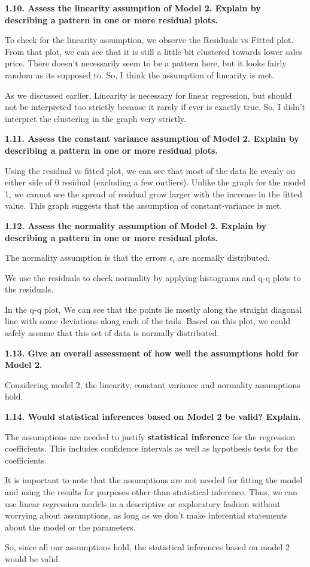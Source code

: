 \documentclass[
]{article}
\begin{document}
\textbf{1.10. Assess the linearity assumption of Model 2. Explain by
describing a pattern in one or more residual plots. }

To check for the linearity assumption, we observe the Residuals vs
Fitted plot. From that plot, we can see that it is still a little bit
clustered towards lower sales price. There doesn't necessarily seem to
be a pattern here, but it looks fairly random as its supposed to. So, I
think the assumption of linearity is met.

As we discussed earlier, Linearity is necessary for linear regression,
but should not be interpreted too strictly because it rarely if ever is
exactly true. So, I didn't interpret the clustering in the graph very
strictly.

\textbf{1.11. Assess the constant variance assumption of Model 2.
Explain by describing a pattern in one or more residual plots.}

Using the residual vs fitted plot, we can see that most of the data lie
evenly on either side of 0 residual (excluding a few outliers). Unlike
the graph for the model 1, we cannot see the spread of residual grow
larger with the increase in the fitted value. This graph suggests that
the assumption of constant-variance is met.

\textbf{1.12. Assess the normality assumption of Model 2. Explain by
describing a pattern in one or more residual plots.}

The normality assumption is that the errors \(\epsilon_i\) are normally
distributed.

We use the residuals to check normality by applying histograms and q-q
plots to the residuals.

In the q-q plot, We can see that the points lie mostly along the
straight diagonal line with some deviations along each of the tails.
Based on this plot, we could safely assume that this set of data is
normally distributed.

\textbf{1.13. Give an overall assessment of how well the assumptions
hold for Model 2.}

Considering model 2, the linearity, constant variance and normality
assumptions hold.

\textbf{1.14. Would statistical inferences based on Model 2 be valid?
Explain.}

The assumptions are needed to justify \textbf{statistical inference} for
the regression coefficients. This includes confidence intervals as well
as hypothesis tests for the coefficients.

It is important to note that the assumptions are not needed for fitting
the model and using the results for purposes other than statistical
inference. Thus, we can use linear regression models in a descriptive or
exploratory fashion without worrying about assumptions, as long as we
don't make inferential statements about the model or the parameters.

So, since all our assumptions hold, the statistical inferences based on
model 2 would be valid.
\end{document}
